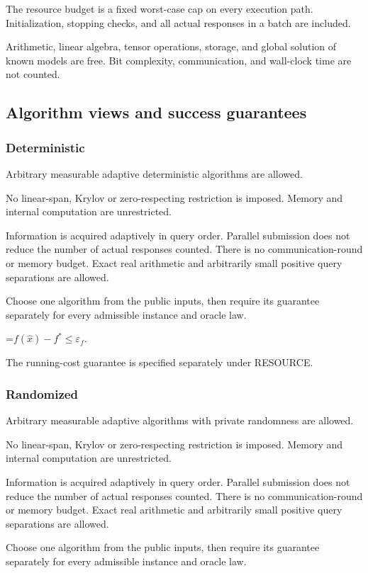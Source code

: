 \documentclass[10pt,a4paper]{article}
\newcommand{\AtlasMath}[1]{\par\begingroup\centering\setbox0=\hbox{$\displaystyle #1$}\ifdim\wd0>1.4\linewidth\typeout{ATLAS WIDE FORMULA: \the\wd0}\fi\ifdim\wd0>\linewidth\resizebox{\linewidth}{!}{\box0}\else\box0\fi\par\endgroup}
\begin{document}
The resource budget is a fixed worst-case cap on every execution path. Initialization, stopping checks, and all actual responses in a batch are included.

Arithmetic, linear algebra, tensor operations, storage, and global solution of known models are free. Bit complexity, communication, and wall-clock time are not counted.

\subsection{Algorithm views and success guarantees}
\subsubsection{Deterministic}
Arbitrary measurable adaptive deterministic algorithms are allowed.

No linear-span, Krylov or zero-respecting restriction is imposed. Memory and internal computation are unrestricted.

Information is acquired adaptively in query order. Parallel submission does not reduce the number of actual responses counted. There is no communication-round or memory budget. Exact real arithmetic and arbitrarily small positive query separations are allowed.

Choose one algorithm from the public inputs, then require its guarantee separately for every admissible instance and oracle law.


\AtlasMath{f(\widehat{x})-f^*\le \varepsilon_f.}


The running-cost guarantee is specified separately under RESOURCE.

\subsubsection{Randomized}
Arbitrary measurable adaptive algorithms with private randomness are allowed.

No linear-span, Krylov or zero-respecting restriction is imposed. Memory and internal computation are unrestricted.

Information is acquired adaptively in query order. Parallel submission does not reduce the number of actual responses counted. There is no communication-round or memory budget. Exact real arithmetic and arbitrarily small positive query separations are allowed.

Choose one algorithm from the public inputs, then require its guarantee separately for every admissible instance and oracle law.
\end{document}
